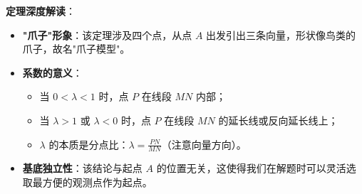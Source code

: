 \begin{explanationbox}
\textbf{定理深度解读}：
\begin{itemize}
    \item \textbf{"爪子"形象}：该定理涉及四个点，从点 $A$ 出发引出三条向量，形状像鸟类的爪子，故名"爪子模型"。
    \item \textbf{系数的意义}：
        \begin{itemize}
            \item 当 $0 < \lambda < 1$ 时，点 $P$ 在线段 $MN$ 内部；
            \item 当 $\lambda > 1$ 或 $\lambda < 0$ 时，点 $P$ 在线段 $MN$ 的延长线或反向延长线上；
            \item $\lambda$ 的本质是分点比：$\lambda = \frac{PN}{MN}$（注意向量方向）。
        \end{itemize}
    \item \textbf{基底独立性}：该结论与起点 $A$ 的位置无关，这使得我们在解题时可以灵活选取最方便的观测点作为起点。
\end{itemize}
\end{explanationbox}
